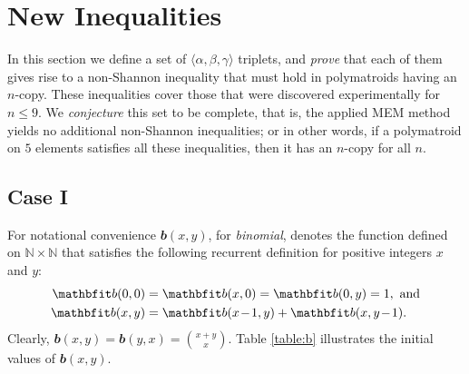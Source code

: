 \documentclass[reqno]{amsart}
\theoremstyle{definition}
\newcommand\tsp{\mkern 1.5mu}
\newcommand\N{\mathbb N}  %
\def\<{\langle}\def\>{\rangle}
\def\b{\mathbfit b}
\def\m#1{\tsp{#1}\tsp}
\begin{document}

\section{New Inequalities}\label{sec:all}

In this section we define a set of $\<\alpha,\beta,\gamma\>$ triplets, and
\emph{prove} that each of them gives rise to a non-Shannon inequality that
must hold in polymatroids having an $n$-copy. These inequalities cover those
that were discovered experimentally for $n\le 9$. We \emph{conjecture} this
set to be complete, that is, the applied MEM method yields no additional
non-Shannon inequalities; or in other words, if a polymatroid on $5$
elements satisfies all these inequalities, then it has an $n$-copy for all
$n$.

\subsection{Case I}

For notational convenience $\b(x,y)$, for \emph{binomial}, denotes
the function defined on $\N\times\N$ that satisfies the following
recurrent definition for positive integers $x$ and $y$:
\begin{align*}
  \b(0,0)&=\b(x,0)=\b(0,y)=1, \mbox{ and}\\
  \b(x,y)&=\b(x\m-1,y)+\b(x,y\m-1).
\end{align*}
Clearly, $\b(x,y)=\b(y,x)={x+y\choose x}$. Table \ref{table:b} illustrates
the initial values of $\b(x,y)$.

\begin{table}[ht]
\caption{The function $\b(x,y)$}\label{table:b}
\end{table}
\end{document}
